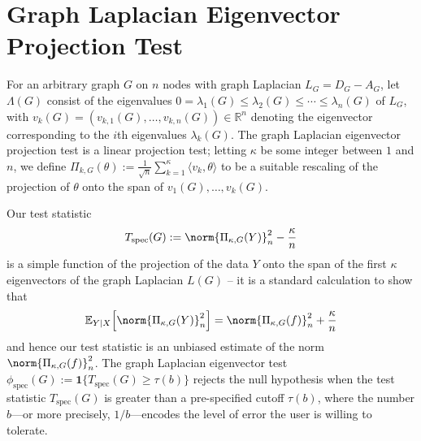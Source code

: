\documentclass{article}
\newcommand{\Reals}{\mathbb{R}}
\newcommand{\1}{\mathbf{1}}
\newcommand{\Ebb}{\mathbb{E}}
\newcommand{\dotp}[2]{\langle #1, #2 \rangle}
\newcommand{\spec}{\mathrm{spec}}
\theoremstyle{alden}
\theoremstyle{aldenthm}
\theoremstyle{definition}
\theoremstyle{remark}
\begin{document}
\section{Graph Laplacian Eigenvector Projection Test}
For an arbitrary graph $G$ on $n$ nodes with graph Laplacian $L_G = D_G - A_G$, let $\Lambda(G)$ consist of the eigenvalues $0 = \lambda_1(G) \leq \lambda_2(G) \leq \cdots \leq \lambda_n(G)$ of $L_G$, with $v_k(G) = (v_{k,1}(G),\ldots,v_{k,n}(G)) \in \Reals^n$ denoting the eigenvector corresponding to the $i$th eigenvalues $\lambda_k(G)$. The graph Laplacian eigenvector projection test is a linear projection test; letting $\kappa$ be some integer between $1$ and $n$, we define $\Pi_{k,G}(\theta) := \frac{1}{\sqrt{n}}\sum_{k = 1}^{\kappa} \dotp{v_k}{\theta}$ to be a suitable rescaling of the projection of $\theta$ onto the span of $v_1(G),\ldots,v_k(G)$. 

Our test statistic
\begin{equation*}
T_{\mathrm{spec}}(G) := \norm{\Pi_{\kappa,G}(Y)}_n^2 - \frac{\kappa}{n}
\end{equation*}
is a simple function of the projection of the data $Y$ onto the span of the first $\kappa$ eigenvectors of the graph Laplacian $L(G)$ -- it is a standard calculation to show that
\begin{equation*}
\Ebb_{Y|X}\Bigl[\norm{\Pi_{\kappa,G}(Y)}_n^2\Bigr] = \norm{\Pi_{\kappa,G}(f)}_n^2 + \frac{\kappa}{n}
\end{equation*}
and hence our test statistic is an unbiased estimate of the norm $\norm{\Pi_{\kappa,G}(f)}_n^2$. The graph Laplacian eigenvector test $\phi_{\spec}(G) := \1\{T_{\spec}(G) \geq \tau(b)\}$ rejects the null hypothesis when the test statistic $T_{\mathrm{spec}}(G)$ is greater than a pre-specified cutoff $\tau(b)$, where the number $b$---or more precisely, $1/b$---encodes the level of error the user is willing to tolerate. 
\end{document}
